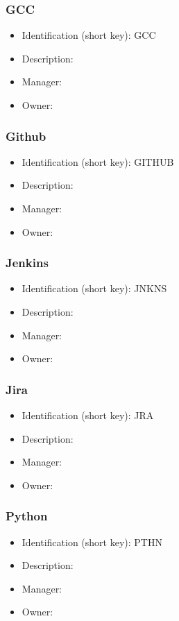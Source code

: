 \subsubsection{GCC}\label{sect:GCC}
\begin{itemize}
\item Identification (short key): GCC
\item Description: 
\item Manager: 
\item Owner: 
\end{itemize}

\subsubsection{Github}\label{sect:GITHUB}
\begin{itemize}
\item Identification (short key): GITHUB
\item Description: 
\item Manager: 
\item Owner: 
\end{itemize}

\subsubsection{Jenkins}\label{sect:JNKNS}
\begin{itemize}
\item Identification (short key): JNKNS
\item Description: 
\item Manager: 
\item Owner: 
\end{itemize}

\subsubsection{Jira}\label{sect:JRA}
\begin{itemize}
\item Identification (short key): JRA
\item Description: 
\item Manager: 
\item Owner: 
\end{itemize}

\subsubsection{Python}\label{sect:PTHN}
\begin{itemize}
\item Identification (short key): PTHN
\item Description: 
\item Manager: 
\item Owner: 
\end{itemize}

